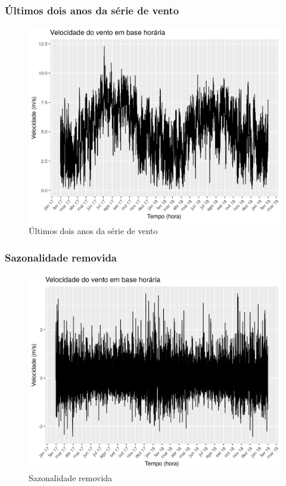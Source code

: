 \documentclass{beamer}
\begin{document}
\begin{frame}
	\frametitle{Últimos dois anos da série de vento}
	\begin{figure}
		\centering
		\includegraphics[width=\textwidth]{entire_series_hourly_basis}
		\caption{Últimos dois anos da série de vento}
	\end{figure}
\end{frame}

\begin{frame}
	\frametitle{Sazonalidade removida}
	\begin{figure}
		\centering
		\includegraphics[width=\textwidth]{entire_series_hourly_basis_seasonless.png}
		\caption{Sazonalidade removida}
	\end{figure}
\end{frame}
\end{document}

